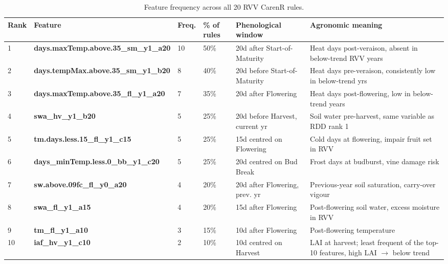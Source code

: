 \begin{table}[!ht]
  \centering
  \caption{Feature frequency across all 20 RVV CarenR rules.}\label{tab:ch4b_2}
  \footnotesize
  \begin{adjustbox}{max width=\textwidth}
    \begin{tabularx}{\textwidth}{p{0.5cm}|p{3.6cm}|p{1.1cm}|p{1.2cm}|p{2.4cm}|X}
  \toprule
  Rank & Feature & Freq. & \% of rules & Phenological window & Agronomic meaning \\
  \midrule
  1 & \textbf{days.maxTemp.above.35\_sm\_y1\_a20} & 10 & 50\% & 20d after Start-of-Maturity & Heat days post-veraison, absent in below-trend RVV years \\
  2 & \textbf{days.tempMax.above.35\_sm\_y1\_b20} & 8 & 40\% & 20d before Start-of-Maturity & Heat days pre-veraison, consistently low in below-trend yrs \\
  3 & \textbf{days.maxTemp.above.35\_fl\_y1\_a20} & 7 & 35\% & 20d after Flowering & Heat days post-flowering, low in below-trend years \\
  4 & \textbf{swa\_hv\_y1\_b20} & 5 & 25\% & 20d before Harvest, current yr & Soil water pre-harvest, same variable as RDD rank 1 \\
  5 & \textbf{tm.days.less.15\_fl\_y1\_c15} & 5 & 25\% & 15d centred on Flowering & Cold days at flowering, impair fruit set in RVV \\
  6 & \textbf{days\_minTemp.less.0\_bb\_y1\_c20} & 5 & 25\% & 20d centred on Bud Break & Frost days at budburst, vine damage risk \\
  7 & \textbf{sw.above.09fc\_fl\_y0\_a20} & 4 & 20\% & 20d after Flowering, prev. yr & Previous-year soil saturation, carry-over vigour \\
  8 & \textbf{swa\_fl\_y1\_a15} & 4 & 20\% & 15d after Flowering & Post-flowering soil water, excess moisture in RVV \\
  9 & \textbf{tm\_fl\_y1\_a10} & 3 & 15\% & 10d after Flowering & Post-flowering temperature \\
  10 & \textbf{iaf\_hv\_y1\_c10} & 2 & 10\% & 10d centred on Harvest & LAI at harvest; least frequent of the top-10 features, high LAI $\rightarrow$ below trend \\
  \bottomrule
\end{tabularx}
  \end{adjustbox}

\end{table}


